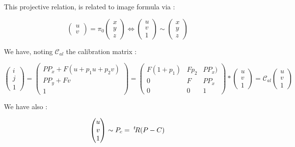 This projective relation, is related to image formula via :

\begin{equation}
	 \begin{pmatrix} u \\ v \end{pmatrix}  = \pi_0  \begin{pmatrix} x \\ y \\z  \end{pmatrix}
   \Leftrightarrow   \begin{pmatrix} u \\ v \\ 1 \end{pmatrix}  \sim  \begin{pmatrix} x \\ y \\z  \end{pmatrix}
\end{equation}

We have, noting $\mathcal{C}_{al}$ the calibration matrix :

\begin{equation}
	   \begin{pmatrix} i \\ j \\ 1\end{pmatrix}
      =   \begin{pmatrix} PP_x + F(u+p_1u+p_2v) \\ PP_y + F v \\ 1\end{pmatrix}
      =  \begin{pmatrix} F(1+p_1) & F p_2 & PP_x ) \\  0 &   F & PP_x \\  0 & 0 &1\end{pmatrix} * \begin{pmatrix} u \\  v \\ 1\end{pmatrix} 
	      =  \mathcal{C}_{al} \begin{pmatrix} u \\  v \\ 1\end{pmatrix} 
\end{equation}

We have also :

\begin{equation}
	 \begin{pmatrix} u \\  v \\ 1\end{pmatrix}
		 \sim P_c =  \; ^{t} \! R(P-C)
\end{equation}

